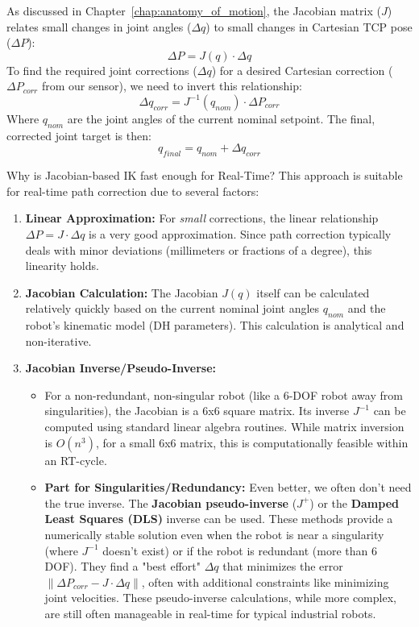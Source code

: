 As discussed in Chapter~\ref{chap:anatomy_of_motion}, the Jacobian matrix (\(J\)) relates small changes in joint angles (\(\Delta q\)) to small changes in Cartesian TCP pose (\(\Delta P\)):
\[ \Delta P = J(q) \cdot \Delta q \]
To find the required joint corrections (\(\Delta q\)) for a desired Cartesian correction (\(\Delta P_{corr}\) from our sensor), we need to invert this relationship:
\[ \Delta q_{corr} = J^{-1}(q_{nom}) \cdot \Delta P_{corr} \]
Where \(q_{nom}\) are the joint angles of the current nominal setpoint. The final, corrected joint target is then:
\[ q_{final} = q_{nom} + \Delta q_{corr} \]

\begin{principlebox}{Why is Jacobian-based IK fast enough for Real-Time?}
    This approach is suitable for real-time path correction due to several factors:
    \begin{enumerate}
        \item \textbf{Linear Approximation:} For \textit{small} corrections, the linear relationship \( \Delta P = J \cdot \Delta q \) is a very good approximation. Since path correction typically deals with minor deviations (millimeters or fractions of a degree), this linearity holds.
        \item \textbf{Jacobian Calculation:} The Jacobian \(J(q)\) itself can be calculated relatively quickly based on the current nominal joint angles \(q_{nom}\) and the robot's kinematic model (DH parameters). This calculation is analytical and non-iterative.
        \item \textbf{Jacobian Inverse/Pseudo-Inverse:}
            \begin{itemize}
                \item For a non-redundant, non-singular robot (like a 6-DOF robot away from singularities), the Jacobian is a 6x6 square matrix. Its inverse \(J^{-1}\) can be computed using standard linear algebra routines. While matrix inversion is \(O(n^3)\), for a small 6x6 matrix, this is computationally feasible within an RT-cycle.
                \item \textbf{Part for Singularities/Redundancy:} Even better, we often don't need the true inverse. The \textbf{Jacobian pseudo-inverse} (\(J^+\)) or the \textbf{Damped Least Squares (DLS)} inverse can be used. These methods provide a numerically stable solution even when the robot is near a singularity (where \(J^{-1}\) doesn't exist) or if the robot is redundant (more than 6 DOF). They find a "best effort" \(\Delta q\) that minimizes the error \( \| \Delta P_{corr} - J \cdot \Delta q \| \), often with additional constraints like minimizing joint velocities. These pseudo-inverse calculations, while more complex, are still often manageable in real-time for typical industrial robots.

\end{itemize}
\end{enumerate}
\end{principlebox}
